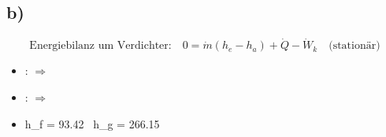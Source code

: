 

\subsection*{b)}

\begin{equation*}
\text{Energiebilanz um Verdichter:} \quad 0 = \dot{m} (h_e - h_a) + \dot{Q} - \dot{W}_k \quad \text{(stationär)}
\end{equation*}

\begin{itemize}
    \item {}: $\Rightarrow$
    \item {}: $\Rightarrow$
    \item {} \quad h_f = 93.42 \,  \quad h_g = 266.15 \, 
\end{itemize}